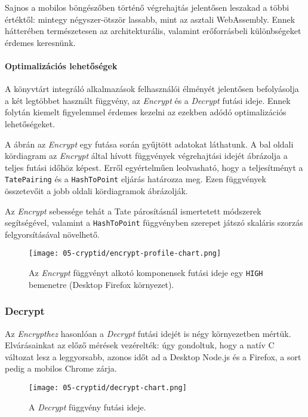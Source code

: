 Sajnos a mobilos böngészőben történő végrehajtás jelentősen leszakad a többi értéktől: mintegy négyszer-ötször lassabb, mint az asztali WebAssembly. Ennek hátterében természetesen az architekturális, valamint erőforrásbeli különbségeket érdemes keresnünk.

\paragraph{Optimalizációs lehetőségek}

A könyvtárt integráló alkalmazások felhasználói élményét jelentősen befolyásolja a két legtöbbet használt függvény, az \textit{Encrypt} és a \textit{Decrypt} futási ideje. Ennek folytán kiemelt figyelemmel érdemes kezelni az ezekben adódó optimalizációs lehetőségeket.

A  ábrán az \textit{Encrypt} egy futása során gyűjtött adatokat láthatunk. A bal oldali kördiagram az \textit{Encrypt} által hívott függvények végrehajtási idejét ábrázolja a teljes futási időhöz képest. Erről egyértelműen leolvasható, hogy a teljesítményt a \texttt{TatePairing} és a \texttt{HashToPoint} eljárás határozza meg. Ezen függvények összetevőit a jobb oldali kördiagramok ábrázolják.

Az \textit{Encrypt} sebessége tehát a Tate párosításnál ismertetett módszerek segítségével, valamint a \texttt{HashToPoint} függvényben szerepet játszó skaláris szorzás felgyorsításával növelhető.

\begin{figure}[h]
    \centering
    \texttt{[image: 05-cryptid/encrypt-profile-chart.png]}
    \caption{Az \textit{Encrypt} függvényt alkotó komponensek futási ideje egy \texttt{HIGH} bemenetre (Desktop Firefox környezet).}
    \label{Figure::CryptID::EncryptProfileChart}
\end{figure}

\subsubsection{Decrypt}

Az \textit{Encrypthez} hasonlóan a \textit{Decrypt} futási idejét is négy környezetben mértük. Elvárásainkat az előző mérések vezérelték: úgy gondoltuk, hogy a natív C változat lesz a leggyorsabb, azonos időt ad a Desktop Node.js és a Firefox, a sort pedig a mobilos Chrome zárja. 

\begin{figure}[h]
    \centering
    \texttt{[image: 05-cryptid/decrypt-chart.png]}
    \caption{A \textit{Decrypt} függvény futási ideje.}
    \label{Figure::CryptID::DecryptChart}
\end{figure}

